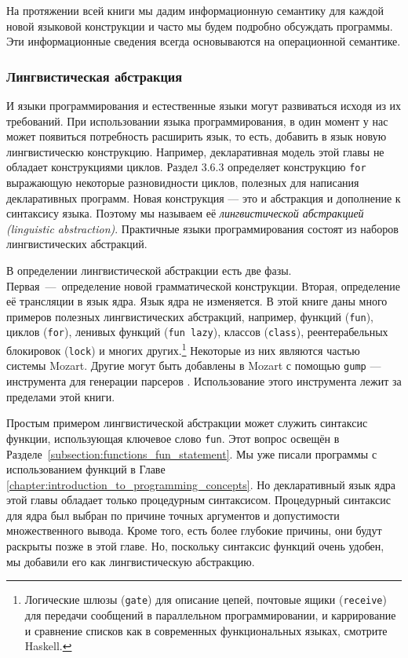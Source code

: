 На протяжении всей книги мы дадим информационную семантику для каждой новой языковой конструкции и часто мы будем подробно обсуждать программы. Эти информационные сведения всегда основываются на операционной семантике.

\subsubsection{Лингвистическая абстракция}

И языки программирования и естественные языки могут развиваться исходя из их требований. При использовании языка программирования, в один момент у нас может появиться потребность расширить язык, то есть, добавить в язык новую лингвистическю конструкцию. Например, декларативная модель этой главы не обладает конструкциями циклов. Раздел 3.6.3 определяет конструкцию \lstinline|for| выражающую некоторые разновидности циклов, полезных для написания декларативных программ. Новая конструкция --- это и абстракция и дополнение к синтаксису языка. Поэтому мы называем её \emph{лингвистической абстракцией (linguistic abstraction)}. Практичные языки программирования состоят из наборов лингвистических абстракций.

В определении лингвистической абстракции есть две фазы. Первая~---~определение новой грамматической конструкции. Вторая, определение её трансляции в язык ядра. Язык ядра не изменяется. В этой книге даны много примеров полезных лингвистических абстракций, например, функций (\lstinline|fun|), циклов (\lstinline|for|), ленивых функций (\lstinline|fun lazy|), классов (\lstinline|class|), реентерабельных блокировок (\lstinline|lock|) и многих других.\footnote{Логические шлюзы (\lstinline|gate|) для описание цепей, почтовые ящики (\lstinline|receive|) для передачи сообщений в параллельном программировании, и каррирование и сравнение списков как в современных функциональных языках, смотрите Haskell.} Некоторые из них являются частью системы Mozart. Другие могут быть добавлены в Mozart с помощью \lstinline|gump| --- инструмента для генерации парсеров \cite{104}. Использование этого инструмента лежит за пределами этой книги.

Простым примером лингвистической абстракции может служить синтаксис функции, использующая ключевое слово \lstinline|fun|. Этот вопрос освещён в Разделе~\ref{subsection:functions_fun_statement}. Мы уже писали программы с использованием функций в Главе \ref{chapter:introduction_to_programming_concepts}. Но декларативный язык ядра этой главы обладает только процедурным синтаксисом. Процедурный синтаксис для ядра был выбран по причине точных аргументов и допустимости множественного вывода. Кроме того, есть более глубокие причины, они будут раскрыты позже в этой главе. Но, поскольку синтаксис функций очень удобен, мы добавили его как лингвистическую абстракцию.

